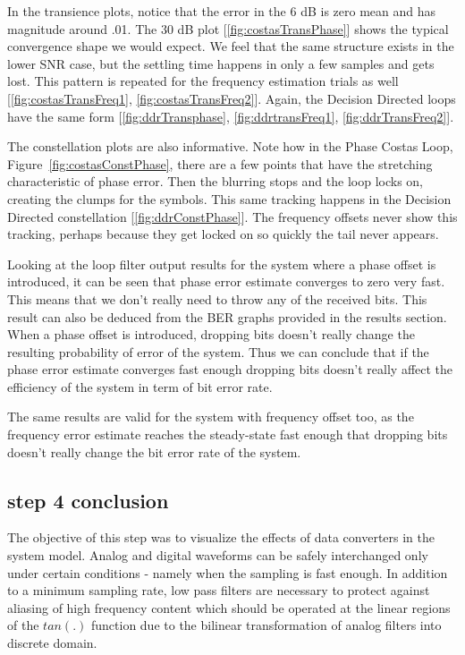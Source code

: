\documentclass[]{article}
\begin{document}
In the transience plots, notice that the error in the 6 dB is zero mean and has magnitude around .01.  The 30 dB plot [\ref{fig:costasTransPhase}]  shows the typical convergence shape we would expect.  We feel that the same structure exists in the lower SNR case, but the settling time happens in only a few samples and gets lost.  This pattern is repeated for the frequency estimation trials as well [\ref{fig:costasTransFreq1}, \ref{fig:costasTransFreq2}].  Again, the Decision Directed loops have the same form [\ref{fig:ddrTransphase}, \ref{fig:ddrtransFreq1}, \ref{fig:ddrTransFreq2}].

The constellation plots are also informative.  Note how in the Phase Costas Loop, Figure~\ref{fig:costasConstPhase}, there are a few points that have the stretching characteristic of phase error.  Then the blurring stops and the loop locks on, creating the clumps for the symbols.  This same tracking happens in the Decision Directed constellation [\ref{fig:ddrConstPhase}].  The frequency offsets never show this tracking, perhaps because they get locked on so quickly the tail never appears.

Looking at the loop filter output results for the system where a phase offset is introduced, it can be seen that phase error estimate converges to zero very fast. This means that we don't really need to throw any of the received bits. This result can also be deduced from the BER graphs provided in the results section. When a phase offset is introduced, dropping bits doesn't really change the resulting probability of error of the system. Thus we can conclude that if the phase error estimate converges fast enough dropping bits doesn't really affect the efficiency of the system in term of bit error rate. 

The same results are valid for the system with frequency offset too, as the frequency error estimate reaches the steady-state fast enough that dropping bits doesn't really change the bit error rate of the system. 

\subsection{step 4 conclusion}
The objective of this step was to visualize the effects of data converters in the system model.  Analog and digital waveforms can be safely interchanged only under certain conditions - namely when the sampling is fast enough.  In addition to a minimum sampling rate, low pass filters are necessary to protect against aliasing of high frequency content which should be operated at the linear regions of the $tan(.) $ function due to the bilinear transformation of analog filters into discrete domain.  \\
\end{document}
